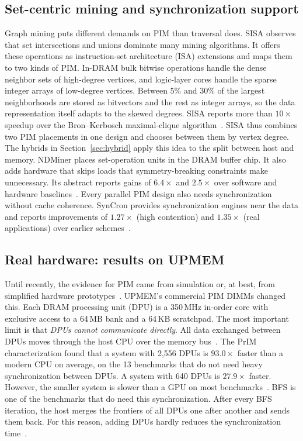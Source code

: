 \documentclass[journal,onecolumn]{IEEEtran}
\begin{document}
\subsection{Set-centric mining and synchronization support}
Graph mining puts different demands on PIM than traversal does. SISA observes that set intersections and unions dominate many mining algorithms. It offers these operations as instruction-set architecture (ISA) extensions and maps them to two kinds of PIM. In-DRAM bulk bitwise operations handle the dense neighbor sets of high-degree vertices, and logic-layer cores handle the sparse integer arrays of low-degree vertices. Between 5\% and 30\% of the largest neighborhoods are stored as bitvectors and the rest as integer arrays, so the data representation itself adapts to the skewed degrees. SISA reports more than $10\times$ speedup over the Bron--Kerbosch maximal-clique algorithm~\cite{besta2021sisa}. SISA thus combines two PIM placements in one design and chooses between them by vertex degree. The hybrids in Section~\ref{sec:hybrid} apply this idea to the split between host and memory. NDMiner places set-operation units in the DRAM buffer chip. It also adds hardware that skips loads that symmetry-breaking constraints make unnecessary. Its abstract reports gains of $6.4\times$ and $2.5\times$ over software and hardware baselines~\cite{talati2022ndminer}. Every parallel PIM design also needs synchronization without cache coherence. SynCron provides synchronization engines near the data and reports improvements of $1.27\times$ (high contention) and $1.35\times$ (real applications) over earlier schemes~\cite{giannoula2021syncron}.

\subsection{Real hardware: results on UPMEM}
Until recently, the evidence for PIM came from simulation or, at best, from simplified hardware prototypes~\cite{gomezluna2022prim}. UPMEM's commercial PIM DIMMs changed this. Each DRAM processing unit (DPU) is a 350\,MHz in-order core with exclusive access to a 64\,MB bank and a 64\,KB scratchpad. The most important limit is that \emph{DPUs cannot communicate directly}. All data exchanged between DPUs moves through the host CPU over the memory bus~\cite{gomezluna2022prim}. The PrIM characterization found that a system with 2,556 DPUs is $93.0\times$ faster than a modern CPU on average, on the 13 benchmarks that do not need heavy synchronization between DPUs. A system with 640 DPUs is $27.9\times$ faster. However, the smaller system is slower than a GPU on most benchmarks~\cite{gomezluna2022prim}. BFS is one of the benchmarks that do need this synchronization. After every BFS iteration, the host merges the frontiers of all DPUs one after another and sends them back. For this reason, adding DPUs hardly reduces the synchronization time~\cite{gomezluna2022prim}.
\end{document}
